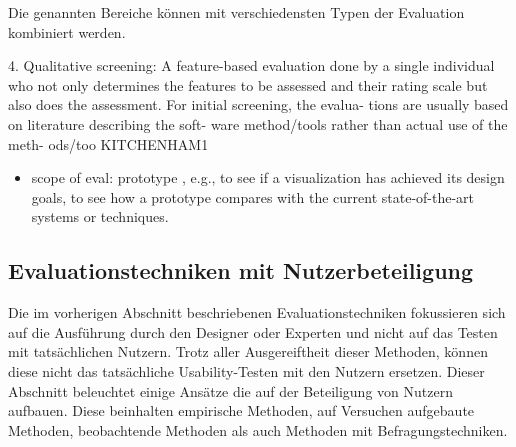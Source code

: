 \documentclass[draft=false
              ,paper=a4
              ,twoside=false
              ,fontsize=11pt
              ,headsepline
              ,BCOR10mm
              ,DIV11
              ]{scrbook}
\newcommand{\TODO}[1]{\colorbox{yellow}{\textcolor{red}{[TODO: #1]}}}
\begin{document}
Die genannten Bereiche können mit verschiedensten Typen der Evaluation kombiniert werden.

4. Qualitative screening: A feature-based evaluation done by a  single individual who not only determines the features to be assessed and their rating scale but also does the assessment. For  initial screening, the evalua- tions are usually based  on literature describing the soft- ware method/tools rather than actual use of the meth- ods/too KITCHENHAM1

\begin{itemize}
  \item scope of eval: prototype , e.g., to see if a visualization has achieved
its design goals, to see how a prototype compares with
the current state-of-the-art systems or techniques.
\end{itemize}
\fi %

\subsection{Evaluationstechniken mit Nutzerbeteiligung} %
\label{sub:evaluationstechniken_mit_nutzerbeteiligung}
Die im vorherigen Abschnitt beschriebenen Evaluationstechniken fokussieren sich auf die Ausführung durch den Designer oder Experten und nicht auf das Testen mit tatsächlichen Nutzern. Trotz aller Ausgereiftheit dieser Methoden, können diese nicht das tatsächliche Usability-Testen mit den Nutzern ersetzen. Dieser Abschnitt beleuchtet einige Ansätze die auf der Beteiligung von Nutzern aufbauen. Diese beinhalten empirische Methoden, auf Versuchen aufgebaute Methoden, beobachtende Methoden als auch Methoden mit Befragungstechniken. %
\end{document}

